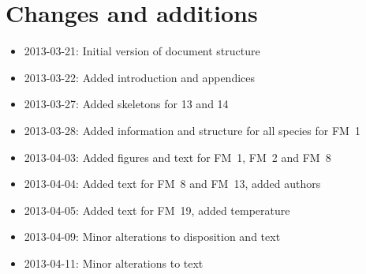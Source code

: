 \chapter{Changes and additions}
\label{ch:changes}

\begin{itemize}
    \item 2013-03-21: Initial version of document structure
    \item 2013-03-22: Added introduction and appendices
    \item 2013-03-27: Added skeletons for 13 and 14
    \item 2013-03-28: Added information and structure for all species for FM~1
    \item 2013-04-03: Added figures and text for FM~1, FM~2 and FM~8
    \item 2013-04-04: Added text for FM~8 and FM~13, added authors
    \item 2013-04-05: Added text for FM~19, added temperature
    \item 2013-04-09: Minor alterations to disposition and text
    \item 2013-04-11: Minor alterations to text
\end{itemize}
